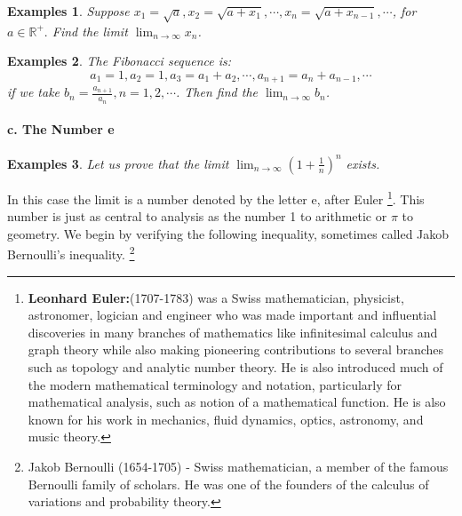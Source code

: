 \documentclass[a4paper,12pt]{article} %
\newtheorem{example}{Examples}
\begin{document}
\begin{example}
    \emph{Suppose} $x_1 = \sqrt{a}, x_2 = \sqrt{a+x_1}, \cdots, x_n = \sqrt{a + x_{n-1}}, \cdots$, 
    for $a \in \mathbb{R}^+.$
    \emph{Find the limit} $\lim_{n \to \infty} x_n$.
\end{example}

\begin{example}
    \emph{The Fibonacci sequence is: }
    \[
        a_1 = 1, a_2 = 1, a_3 = a_1 + a_2, \cdots, a_{n+1} = a_n + a_{n-1}, \cdots
        \]
    \emph{if we take }
    $\displaystyle b_n = \frac{a_{n+1}}{a_n}, n = 1,2,\cdots$.
    \emph{Then find the} $\displaystyle \lim_{n \to \infty} b_n$.
\end{example}

\paragraph{{\rm \textbf{c. The Number e }}}
\begin{example}
    Let us prove that the limit $\displaystyle \lim_{n \to \infty}\left(1+\frac{1}{n}\right)^n $ exists.
\end{example}
In this case the limit is a number denoted by the letter e, after Euler
\footnote{\textbf{Leonhard Euler:}(1707-1783) was a Swiss mathematician, 
physicist, astronomer, logician and engineer who was made important and 
influential discoveries in many branches of mathematics like infinitesimal 
calculus and graph theory while also making pioneering contributions to 
several branches such as topology and analytic number theory. He is also
introduced much of the modern mathematical terminology and notation, particularly 
for mathematical analysis, such as notion of a mathematical function. He is also 
known for his work in mechanics, fluid dynamics, optics, astronomy, and music theory.}.
This number is just as central to analysis as the number 1 to arithmetic 
or $\pi$ to geometry. We begin by verifying the following inequality, 
sometimes called Jakob Bernoulli's inequality. \footnote{Jakob Bernoulli 
(1654-1705) - Swiss mathematician, a member of the famous Bernoulli 
family of scholars. He was one of the founders of the calculus of 
variations and probability theory.}
\end{document}
